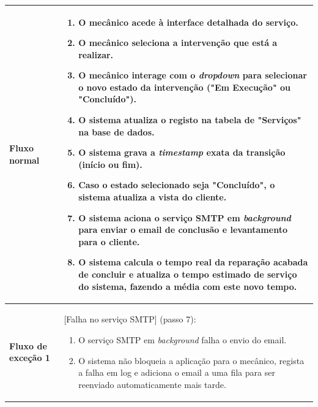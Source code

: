 \documentclass[a4paper,12pt]{scrreprt}
\begin{document}
\begin{longtable}{|>{\columncolor{black!10}\bfseries}p{3.5cm}|p{11.5cm}|}
Fluxo normal & 
\begin{enumerate}[leftmargin=*, nosep, topsep=2pt, partopsep=0pt]
    \item O mecânico acede à interface detalhada do serviço.
    \item O mecânico seleciona a intervenção que está a realizar.
    \item O mecânico interage com o \textit{dropdown} para selecionar o novo estado da intervenção ("Em Execução" ou "Concluído").
    \item O sistema atualiza o registo na tabela de "Serviços" na base de dados.
    \item O sistema grava a \textit{timestamp} exata da transição (início ou fim).
    \item Caso o estado selecionado seja "Concluído", o sistema atualiza a vista do cliente.
    \item O sistema aciona o serviço SMTP em \textit{background} para enviar o email de conclusão e levantamento para o cliente.
    \item O sistema calcula o tempo real da reparação acabada de concluir e atualiza o tempo estimado de serviço do sistema, fazendo a média com este novo tempo.
\end{enumerate} \\ \hline

Fluxo de exceção 1 & [Falha no serviço SMTP] (passo 7):
\begin{enumerate}[label=7.\arabic*., leftmargin=*, nosep, topsep=2pt, partopsep=0pt]
    \item O serviço SMTP em \textit{background} falha o envio do email.
    \item O sistema não bloqueia a aplicação para o mecânico, regista a falha em log e adiciona o email a uma fila para ser reenviado automaticamente mais tarde.
\end{enumerate} \\ \hline

\end{longtable}
\end{document}
